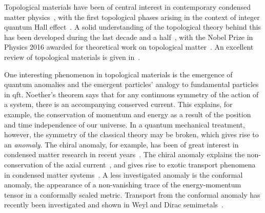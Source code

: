 %
Topological materials have been of central interest in contemporary condensed matter physics~\cite{fruchartIntroductionTopologicalInsulators2013}, with the first topological phases arising in the context of integer quantum Hall effect~\cites{klitzingNewMethodHighAccuracy1980}[as cited in][]{fruchartIntroductionTopologicalInsulators2013}.
A solid understanding of the topological theory behind this has been developed during the last decade and a half~\cite{fruchartIntroductionTopologicalInsulators2013, bernevigTopologicalInsulatorsTopological2013}, with the Nobel Prize in Physics 2016 awarded for theoretical work on topological matter~\cite{royalswedishacademyofsciencesNobelPrizePhysics}.
An excellent review of topological materials is given in~\cite{fruchartIntroductionTopologicalInsulators2013}.

One interesting phenomenon in topological materials is the emergence of quantum anomalies and the emergent particles' analogy to fundamental particles in \gls{qft}.
Noether's theorem says that for any continuous symmetry of the action of a system, there is an accompanying conserved current.
This explains, for example, the conservation of momentum and energy as a result of the position and time independence of our universe.
In a quantum mechanical treatment, however, the symmetry of the classical theory may be broken, which gives rise to an \emph{anomaly}.
The chiral anomaly, for example, has been of great interest in condensed matter research in recent years~\cite{arjonaFingerprintsConformalAnomaly2019}.
The chiral anomaly explains the non-conservation of the axial current~\cite{zeeQuantumFieldTheory2010}, and gives rise to exotic transport phenomena in condensed matter systems~\cite{burkovChiralAnomalyTransport2015, wehlingDiracMaterials2014, burkovTopologicalSemimetals2016}.
A less investigated anomaly is the conformal anomaly, the appearance of a non-vanishing trace of the energy-momentum tensor in a conformally scaled metric.
Transport from the conformal anomaly has recently been investigated and shown in Weyl and Dirac semimetals~\cite{chernodubAnomalousTransportDue2016, chernodubGenerationNernstCurrent2018, arjonaFingerprintsConformalAnomaly2019}.

